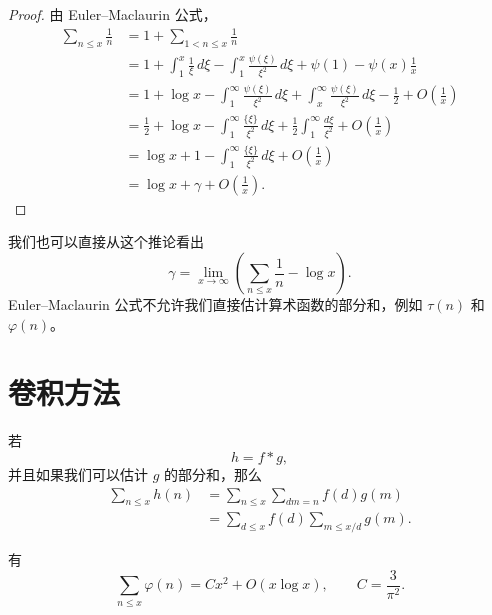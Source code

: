 \begin{proof}
	由 Euler--Maclaurin 公式，
	\[
	\begin{aligned}
		\sum_{n\leq x}\frac1n
		&=
		1+\sum_{1<n\leq x}\frac1n \\
		&=
		1+\int_1^x\frac1\xi\,d\xi
		-\int_1^x\frac{\psi(\xi)}{\xi^2}\,d\xi
		+\psi(1)-\psi(x)\frac1x \\
		&=
		1+\log x-\int_1^\infty\frac{\psi(\xi)}{\xi^2}\,d\xi
		+\int_x^\infty\frac{\psi(\xi)}{\xi^2}\,d\xi
		-\frac12+O\left(\frac1x\right) \\
		&=
		\frac12+\log x
		-\int_1^\infty\frac{\{\xi\}}{\xi^2}\,d\xi
		+\frac12\int_1^\infty\frac{d\xi}{\xi^2}
		+O\left(\frac1x\right) \\
		&=
		\log x+1-\int_1^\infty\frac{\{\xi\}}{\xi^2}\,d\xi
		+O\left(\frac1x\right) \\
		&=
		\log x+\gamma+O\left(\frac1x\right).
	\end{aligned}
	\]
\end{proof}

\begin{remark}
	我们也可以直接从这个推论看出
	\[
		\gamma
		=
		\lim_{x\to\infty}\left(\sum_{n\leq x}\frac1n-\log x\right).
	\]
	Euler--Maclaurin 公式不允许我们直接估计算术函数的部分和，例如 $\tau(n)$ 和 $\varphi(n)$。
\end{remark}

\section{卷积方法}


若
\[
	h=f*g,
\]
并且如果我们可以估计 $g$ 的部分和，那么
\[
\begin{aligned}
	\sum_{n\leq x}h(n)
	&=
	\sum_{n\leq x}\sum_{dm=n}f(d)g(m) \\
	&=
	\sum_{d\leq x}f(d)\sum_{m\leq x/d}g(m).
\end{aligned}
\]

\begin{theorem}[原文 Theorem 3]
	有
	\[
		\sum_{n\leq x}\varphi(n)
		=
		Cx^2+O(x\log x),
		\qquad
		C=\frac{3}{\pi^2}.
	\]
\end{theorem}

